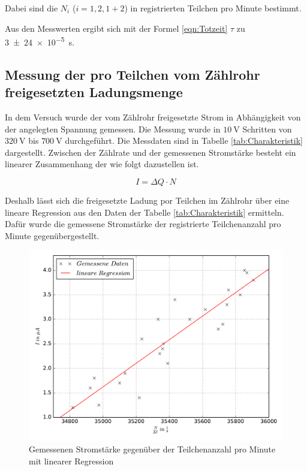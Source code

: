 Dabei sind die $N_i$ ($i = 1, 2, 1+2$) in registrierten Teilchen pro Minute bestimmt.

Aus den Messwerten ergibt sich mit der Formel \eqref{eqn:Totzeit}
$\tau$ zu \SI{3(24)e-5}{\second}.

\subsection{Messung der pro Teilchen vom Zählrohr freigesetzten Ladungsmenge}

In dem Versuch wurde der vom Zählrohr freigesetzte Strom
in Abhängigkeit von der angelegten Spannung gemessen.
Die Messung wurde in $\SI{10}{\volt}$ Schritten von
$\SI{320}{\volt}$ bis $\SI{700}{\volt}$ durchgeführt.
Die Messdaten sind in Tabelle \ref{tab:Charakteristik} dargestellt.
Zwischen der Zählrate und der gemessenen Stromstärke besteht ein
linearer Zusammenhang der wie folgt dazustellen ist.

\begin{equation*}
  I = \Delta Q \cdot N
\end{equation*}

Deshalb lässt sich die freigesetzte Ladung por Teilchen im Zählrohr über eine
lineare Regression aus den Daten der Tabelle \ref{tab:Charakteristik} ermitteln.
Dafür wurde die gemessene Stromstärke der registrierte Teilchenanzahl pro Minute
gegenübergestellt.

\begin{figure}
  \centering
  \includegraphics[width=\textwidth]{Stromstärke_gegen_Anzahl.pdf}
  \caption{Gemessenen Stromstärke gegenüber der Teilchenanzahl pro Minute mit linearer Regression}
  \label{fig:Stromstärke_gegen_Anzahl}
\end{figure}


